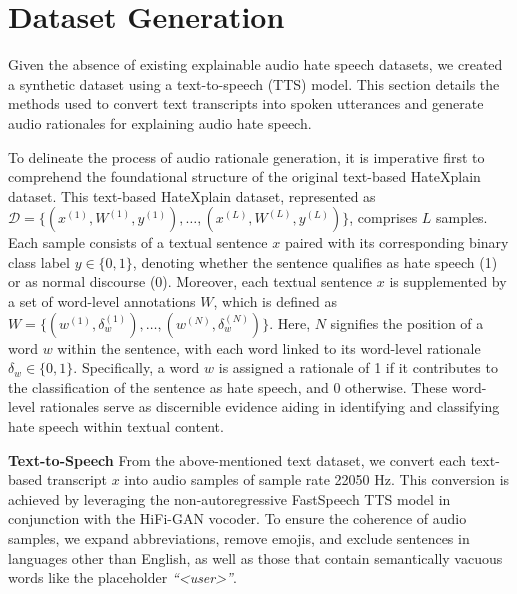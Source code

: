 \documentclass[11pt]{article}
\begin{document}
\section{Dataset Generation}
Given the absence of existing explainable audio hate speech datasets, we created a synthetic dataset using a text-to-speech (TTS) model. This section details the methods used to convert text transcripts into spoken utterances and generate audio rationales for explaining audio hate speech.

To delineate the process of audio rationale generation, it is imperative first to comprehend the foundational structure of the original text-based HateXplain \cite{HateXplain} dataset. This text-based HateXplain dataset, represented as $\mathcal{D} = \{(x^{(1)}, W^{(1)}, y^{(1)}), \ldots, (x^{(L)}, W^{(L)}, y^{(L)})\}$, comprises $L$ samples. Each sample consists of a textual sentence $x$ paired with its corresponding binary class label $y \in \{0, 1\}$, denoting whether the sentence qualifies as hate speech (1) or as normal discourse (0). Moreover, each textual sentence $x$ is supplemented by a set of word-level annotations $W$, which is defined as $W = \{(w^{(1)}, \delta^{(1)}_w), \ldots, (w^{(N)}, \delta^{(N)}_w)\}$. Here, $N$ signifies the position of a word $w$ within the sentence, with each word linked to its word-level rationale $\delta_w \in \{0,1\}$. Specifically, a word $w$ is assigned a rationale of 1 if it contributes to the classification of the sentence as hate speech, and 0 otherwise. These word-level rationales serve as discernible evidence aiding in identifying and classifying hate speech within textual content.

\noindent\textbf{Text-to-Speech} From the above-mentioned text dataset, we convert each text-based transcript $x$ into audio samples of sample rate 22050 Hz. This conversion is achieved by leveraging the non-autoregressive FastSpeech \cite{FastSpeech2} TTS model in conjunction with the HiFi-GAN \cite{HifiGAN} vocoder. To ensure the coherence of audio samples, we expand abbreviations, remove emojis, and exclude sentences in languages other than English, as well as those that contain semantically vacuous words like the placeholder \textit{``\textless user\textgreater''}. 
\end{document}

